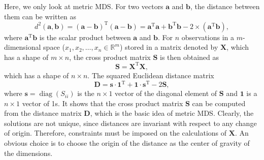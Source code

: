 Here, we only look at metric MDS. For two vectors $\mathbf{a}$ and $\mathbf{b}$, the distance between them can be written as
\begin{equation}
	d^2(\mathbf{a},\mathbf{b})=(\mathbf{a}-\mathbf{b})^{\operatorname{T}}(\mathbf{a}-\mathbf{b})=\mathbf{a}^{\operatorname{T}}\mathbf{a}+\mathbf{b}^{\operatorname{T}}\mathbf{b}-2\times(\mathbf{a}^{\operatorname{T}}\mathbf{b}),
\end{equation}
where $\mathbf{a}^{\operatorname{T}}\mathbf{b}$ is the scalar product between $\mathbf{a}$ and $\mathbf{b}$. For $n$ observations in a $m$-dimensional space ($x_1, x_2, \dots, x_n\in \mathbb{R}^m$) stored in a matrix denoted by $\mathbf{X}$, which has a shape of $m\times n$, the cross product matrix $\mathbf{S}$ is then obtained as
\begin{equation}
	\mathbf{S}=\mathbf{X}^{\operatorname{T}}\mathbf{X},
\end{equation}
which has a shape of $n\times n$. The squared Euclidean distance matrix
\begin{equation}
	\mathbf{D}=\mathbf{s}\cdot\mathbf{1}^{\operatorname{T}}+\mathbf{1}\cdot\mathbf{s}^{\operatorname{T}}-2\mathbf{S},
	\label{eq:DR:MDS:D_vs_S}
\end{equation}
where $\mathbf{s}=\operatorname{diag}(S_{ii})$ is the $n\times 1$ vector of the diagonal element of $\mathbf{S}$ and $\mathbf{1}$ is a $n\times 1$ vector of 1s. It shows that the cross product matrix $\mathbf{S}$ can be computed from the distance matrix $\mathbf{D}$, which is the basic idea of metric MDS. Clearly, the solutions are not unique, since distances are invariant with respect to any change of origin. Therefore, constraints must be imposed on the calculations of $\mathbf{X}$. An obvious choice is to choose the origin of the distance as the center of gravity of the dimensions.

